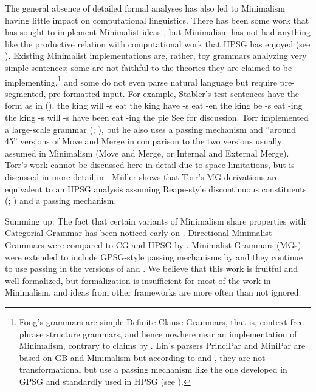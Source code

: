 \documentclass[output=paper
 	        ,biblatex
                ,babelshorthands
                ,newtxmath
                ,draftmode
                ,colorlinks, citecolor=brown
]{langscibook}
\begin{document}
The general absence of detailed formal analyses has also led to Minimalism having little impact on
computational linguistics. There has been some work that has sought to implement Minimalist ideas
\citep{Stabler2001a,FG2012a,Fong2014a,Torr2019a-u}, but Minimalism has not had anything like the productive
relation with computational work that HPSG has enjoyed (see ). Existing Minimalist implementations are, rather, toy
grammars analyzing very simple sentences; some are not faithful to the theories they are claimed to
be implementing,\footnote{%
  Fong's grammars are simple Definite Clause Grammars, that is, context-free phrase structure grammars, and hence nowhere near an implementation of
  Minimalism, contrary to claims by \citet*[]{BPYC2011a}.
  Lin's parsers PrinciPar and MiniPar \citeyearpar{Lin93a,Lin2003a-u} are based on GB and Minimalism
  but according to \citet[]{Lin93a} and \citet[]{TSSC2019a}, they
  are not transformational but use a \slasch passing mechanism like the one developed in GPSG
  \citep{Gazdar81a} and standardly used in HPSG (see ).
} and some do not even parse natural language but require pre-segmented, pre-formatted
input. For example, Stabler's test sentences have the form as in ().
\eal
\ex the king will -s eat
\ex the king have -s eat -en
\ex the king be -s eat -ing
\ex the king -s will -s have been eat -ing the pie
\zl
See \citet[Section~4.7.2]{MuellerGT-Eng4} for discussion. Torr implemented a large-scale grammar
(\citealt*[]{TSSC2019a}; \citealt{Torr2019a-u}), but he also uses a \slasch passing mechanism and ``around 45''
versions of Move and Merge \citep[]{TSSC2019a} in comparison to the two versions usually assumed in
Minimalism (Move and Merge, or Internal and External Merge). Torr's work cannot be discussed here in 
detail due to space limitations, but is discussed in more detail in \citet[--180]{MuellerGT-Eng4}. Müller shows that Torr's MG derivations are equivalent to an HPSG analysis
assuming Reape-style discontinuous constituents (\citealt{Reape94a};
) and a \slasch passing mechanism.


Summing up: The fact that certain variants of Minimalism share properties with Categorial Grammar
has been noticed early on \citep{BE95a}. Directional Minimalist Grammars were compared to CG and HPSG
by \citet[Section~2.3]{MuellerUnifying}. Minimalist Grammars (MGs) were extended to include GPSG-style \slasch passing mechanisms by
\citet{Kobele2008a} and they continue to use \slasch passing in the versions of \citet{TS2016a} and \citet{Torr2019a-u}. We believe that
this work is fruitful and well-formalized, but formalization is insufficient for most of the work in
Minimalism, and ideas from other frameworks are more often than not ignored.
\end{document}
